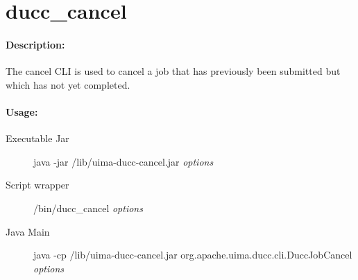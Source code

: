 \ifpdf
\else
{}
\fi
    \section{ducc\_cancel}
    \label{sec:cli.ducc-cancel}

    \paragraph{Description:}
    The cancel CLI is used to cancel a job that has previously been submitted but which has not yet 
    completed. 

    \paragraph{Usage:}
    \begin{description}
    \item[Executable Jar] java -jar \ducchome/lib/uima-ducc-cancel.jar {\em options}
    \item[Script wrapper] \ducchome/bin/ducc\_cancel {\em options}
    \item[Java Main]      java -cp \ducchome/lib/uima-ducc-cancel.jar org.apache.uima.ducc.cli.DuccJobCancel {\em options}
    \end{description}

